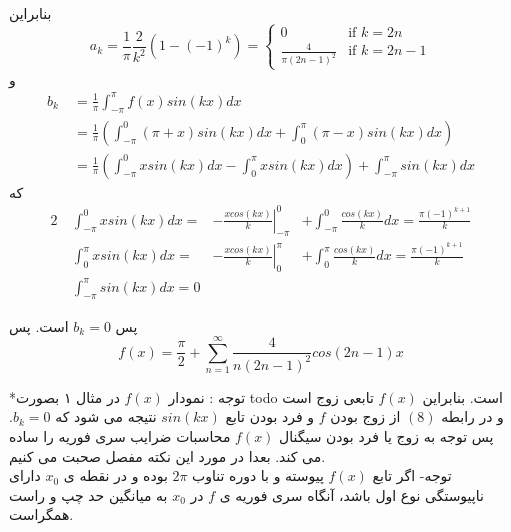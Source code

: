 \begin{example}
 بنابراین
 \[
 a_k=\frac{1}{\pi}\frac{2}{k^2}\left(1-(-1)^k\right)=
 \begin{cases}
 0 &\mbox{if } k=2n\\
 \frac{4}{\pi(2n-1)^2} &\mbox{if } k=2n-1
 \end{cases}
 \]
 و
\begin{equation*}
	\begin{aligned}
	b_k {} &\ = \frac{1}{\pi}\int_{-\pi}^{\pi}{f(x)sin(kx)dx}\\
	&\ = \frac{1}{\pi}\left(
	\int_{-\pi}^{0}{(\pi+x)sin(kx)dx}+\int_{0}^{\pi}{(\pi-x)sin(kx)dx}
	\right)\\
	&\ = \frac{1}{\pi}\left(\int_{-\pi}^{0}{xsin(kx)dx}-\int_{0}^{\pi}{xsin(kx)dx} \right)+\int_{-\pi}^{\pi}{sin(kx)dx}
	\end{aligned}
\end{equation*}
که
\begin{alignat*}{2}
{} &\ \int_{-\pi}^{0}{xsin(kx)dx}
	=&\left.{-\frac{xcos(kx)}{k}}\right |_{-\pi}^{0} 
	&+\int_{-\pi}^{0}{\frac{cos(kx)}{k}dx}=\frac{\pi(-1)^{k+1}}{k}\\
&\ \int_{0}^{\pi}{xsin(kx)dx}
	=&\left.{-\frac{xcos(kx)}{k}}\right |_{0}^{\pi} 
	&+\int_{0}^{\pi}{\frac{cos(kx)}{k}dx}=\frac{\pi(-1)^{k+1}}{k}\\
&\ \int_{-\pi}^{\pi}{sin(kx)dx}=0
\end{alignat*}

پس 
$b_k=0$
است. پس\\
\[f(x)=\frac{\pi}{2}+\sum_{n=1}^{\infty}{\frac{4}{n(2n-1)^2}}cos(2n-1)x\]

\end{example}
\hrulefill

*توجه : نمودار 
$f(x)$
در مثال ۱ بصورت 
todo
است. بنابراین 
$f(x)$
تابعی زوج است و در رابطه 
$(8)$
از زوج بودن 
$f$
و فرد بودن تابع
$sin(kx)$
نتیجه می شود که 
$b_k=0$.
پس توجه به زوج یا فرد بودن سیگنال 
$f(x)$
محاسبات ضرایب سری فوریه را ساده می کند. بعدا در مورد این نکته مفصل صحبت می کنیم.\\
توجه- اگر تابع 
$f(x)$
پیوسته و با دوره تناوب 
$2\pi$
بوده و در نقطه ی 
$x_0$
دارای ناپیوستگی نوع اول باشد، آنگاه سری فوریه ی
$f$
در
$x_0$
به میانگین حد چپ و راست همگراست.\\

\hrulefill

